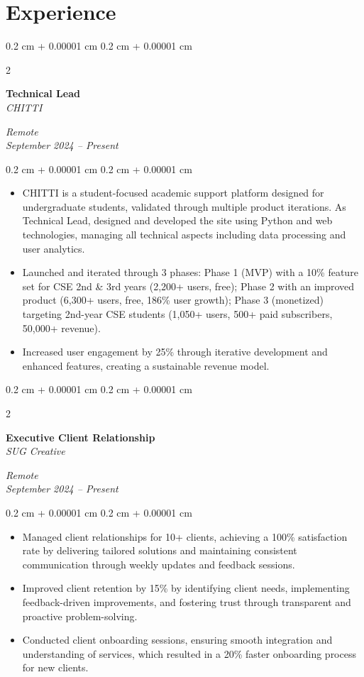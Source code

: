 \documentclass[10pt, letterpaper]{article}
\newenvironment{highlights}{
    \begin{itemize}[
        topsep=0.10 cm,
        parsep=0.10 cm,
        partopsep=0pt,
        itemsep=0pt,
        leftmargin=0.4 cm + 10pt
    ]
}{
    \end{itemize}
} %
\newenvironment{onecolentry}{
    \begin{adjustwidth}{
        0.2 cm + 0.00001 cm
    }{
        0.2 cm + 0.00001 cm
    }
}{
    \end{adjustwidth}
} %
\newenvironment{twocolentry}[2][]{
    \onecolentry
    \def\secondColumn{#2}
    \setcolumnwidth{\fill, 4.5 cm}
    \begin{paracol}{2}
}{
    \switchcolumn \raggedleft \secondColumn
    \end{paracol}
    \endonecolentry
} %
\begin{document}
    \section{Experience}
    \begin{twocolentry}{
        \textit{Remote} \\
        \textit{September 2024 – Present}
    }
        \textbf{Technical Lead} \\
        \textit{CHITTI}
    \end{twocolentry}
    \vspace{0.10 cm}
    \begin{onecolentry}
        \begin{highlights}
            \item CHITTI is a student-focused academic support platform designed for undergraduate students, validated through multiple product iterations. As Technical Lead, designed and developed the site using Python and web technologies, managing all technical aspects including data processing and user analytics.
            \item Launched and iterated through 3 phases: Phase 1 (MVP) with a 10\% feature set for CSE 2nd \& 3rd years (2,200+ users, free); Phase 2 with an improved product (6,300+ users, free, 186\% user growth); Phase 3 (monetized) targeting 2nd-year CSE students (1,050+ users, 500+ paid subscribers, 50,000+ revenue).
            \item Increased user engagement by 25\% through iterative development and enhanced features, creating a sustainable revenue model.
        \end{highlights}
    \end{onecolentry}
    \vspace{0.2 cm}
    \begin{twocolentry}{
        \textit{Remote} \\
        \textit{September 2024 – Present}
    }
        \textbf{Executive Client Relationship} \\
        \textit{SUG Creative}
    \end{twocolentry}
    \vspace{0.10 cm}
    \begin{onecolentry}
        \begin{highlights}
            \item Managed client relationships for 10+ clients, achieving a 100\% satisfaction rate by delivering tailored solutions and maintaining consistent communication through weekly updates and feedback sessions.
            \item Improved client retention by 15\% by identifying client needs, implementing feedback-driven improvements, and fostering trust through transparent and proactive problem-solving.
            \item Conducted client onboarding sessions, ensuring smooth integration and understanding of services, which resulted in a 20\% faster onboarding process for new clients.
        \end{highlights}
    \end{onecolentry}
\end{document}
